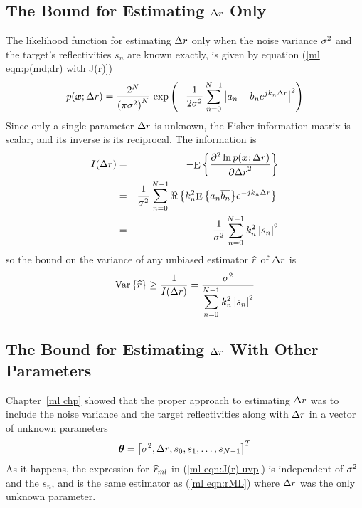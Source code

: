 \subsection{The \CR Bound for Estimating ${\Delta r}$ Only}
\label{sp sec:CRB1}

The likelihood function for estimating ${\Delta r}$ only when the noise variance
${\sigma^2}$ and the target's reflectivities $s_n$ are known exactly, is given by
equation (\ref{ml eqn:p(md;dr) with J(r)})
\begin{equation}
p(\bm{x};{\Delta r})=\frac{2^N}{\left(\pi{\sigma^2}\right)^N}\,\exp\left(-\frac{1}{2{\sigma^2}}
\displaystyle\sum_{n=0}^{N-1}\left|a_n-b_n{e^{jk_n{\Delta r}}}\right|^2\right)
\end{equation}
Since only a single parameter ${\Delta r}$ is unknown, the Fisher information matrix
is scalar, and its inverse is its reciprocal.  The information is
\begin{eqnarray}
I({\Delta r})&=&-{\mathop{\rm E}\nolimits\left\{\frac{{\partial}^2\ln p(\bm{x};{\Delta r})}{{\partial}{\Delta r}^2}\right\}}{\nonumber}\\
&=&\frac{1}{{\sigma^2}}\displaystyle\sum_{n=0}^{N-1}\Re\left\{k_n^2{\mathop{\rm E}\nolimits\left\{a_n\overline{b_n}\right\}}{e^{-jk_n{\Delta r}}}\right\}{\nonumber}\\
&=&\frac{1}{{\sigma^2}}\displaystyle\sum_{n=0}^{N-1}k_n^2\left|s_n\right|^2
\end{eqnarray}
so the \CR bound on the variance of any unbiased estimator $\widehat{r}$ of ${\Delta r}$
is
\begin{equation}
{\mathop{\rm Var}\nolimits\left\{\widehat{r}\right\}}\geq\frac{1}{I({\Delta r})}
=\frac{{\sigma^2}}{\displaystyle\sum_{n=0}^{N-1}k_n^2\left|s_n\right|^2}
\end{equation}

\subsection{The \CR Bound for Estimating ${\Delta r}$ With Other Parameters}
\label{sp sec:CRB2}


Chapter~\ref{ml chp} showed that the proper approach to estimating ${\Delta r}$
was to include the noise variance and the target reflectivities along with
${\Delta r}$ in a vector of unknown parameters
\begin{equation}\label{sp eqn:uvp}
\bm{\theta}=\left[{\sigma^2}, {\Delta r}, s_0, s_1, \ldots, s_{N-1}\right]^T
\end{equation}
As it happens, the expression for $\widehat{r}_{ml}$ in (\ref{ml eqn:J(r) uvp}) is
independent of ${\sigma^2}$ and the $s_n$, and is the same estimator as
(\ref{ml eqn:rML}) where ${\Delta r}$ was the only unknown parameter.

